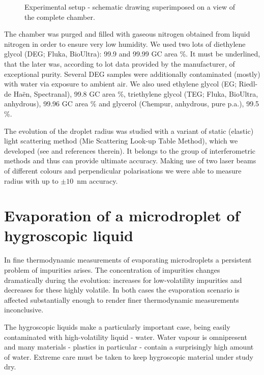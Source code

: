 \documentclass[twoside,twocolumn,9pt]{article}
\begin{document}
\begin{figure}[htb]
 \centering
 \caption{Experimental setup - schematic drawing superimposed on a view of the complete chamber.}
 \label{setup4mixed}
\end{figure}

The chamber was purged and filled with gaseous nitrogen obtained from liquid nitrogen in order to ensure very low humidity.
We used two lots of diethylene glycol (DEG; Fluka, BioUltra): 99.9 and 99.99 GC area \%. It must be underlined, that the later was, according to lot data provided by the manufacturer, of exceptional purity. Several DEG samples were additionally contaminated (mostly) with water via exposure to ambient air.
We also used ethylene glycol (EG; Riedl-de {Ha\"{e}n}, Spectranal), 99.8 GC area \%, triethylene glycol (TEG; Fluka, BioUltra, anhydrous), 99.96 GC area \% and glycerol (Chempur, anhydrous, pure p.a.), 99.5 \%.

The evolution of the droplet radius was studied with a variant of static (elastic) light scattering method (Mie Scattering Look-up Table Method), which we developed (see \cite{Smigacz} and references therein). It belongs to the group of interferometric methods and thus can provide ultimate accuracy. Making use of two laser beams of different colours and perpendicular polarisations we were able to measure radius with up to $\pm 10$~nm accuracy. 

\section{Evaporation of a microdroplet of hygroscopic liquid}
In fine thermodynamic measurements of evaporating microdroplets a persistent problem of impurities arises. The concentration of impurities changes dramatically during the evolution: increases for low-volatility impurities and decreases for these highly volatile. In both cases the evaporation scenario is affected substantially enough to render finer thermodynamic measurements inconclusive.

The hygroscopic liquids make a particularly important case, being easily contaminated with high-volatility liquid - water. Water vapour is omnipresent and many materials - plastics in particular - contain a surprisingly high amount of water. Extreme care must be taken to keep hygroscopic material under study dry.
\end{document}
